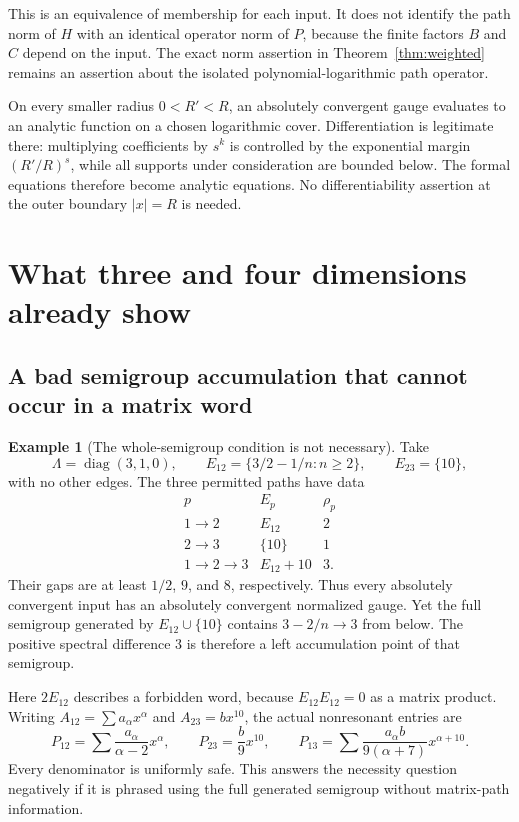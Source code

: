 \documentclass[11pt,a4paper]{article}
\numberwithin{equation}{section}
\theoremstyle{definition}
\newtheorem{example}[theorem]{Example}
\theoremstyle{remark}
\newcommand{\diag}{\operatorname{diag}}
\begin{document}
This is an equivalence of membership for each input. It does not identify
the path norm of $H$ with an identical operator norm of $P$, because the
finite factors $B$ and $C$ depend on the input. The exact norm assertion in
Theorem~\ref{thm:weighted} remains an assertion about the isolated
polynomial-logarithmic path operator.

On every smaller radius $0<R'<R$, an absolutely convergent gauge evaluates
to an analytic function on a chosen logarithmic cover. Differentiation is
legitimate there: multiplying coefficients by $s^k$ is controlled by the
exponential margin $(R'/R)^s$, while all supports under consideration are
bounded below. The formal equations therefore become analytic equations.
No differentiability assertion at the outer boundary $|x|=R$ is needed.

\section{What three and four dimensions already show}
\label{sec:examples}

\subsection{A bad semigroup accumulation that cannot occur in a matrix word}
\begin{example}[The whole-semigroup condition is not necessary]
\label{ex:harmless}
Take
\[
 \Lambda=\diag(3,1,0),\qquad
 E_{12}=\{3/2-1/n:n\geq2\},\qquad E_{23}=\{10\},
\]
with no other edges. The three permitted paths have data
\[
 \begin{array}{c|c|c}
 p&E_p&\rho_p\\ \hline
 1\to2&E_{12}&2\\
 2\to3&\{10\}&1\\
 1\to2\to3&E_{12}+10&3.
 \end{array}
\]
Their gaps are at least $1/2$, $9$, and $8$, respectively. Thus every
absolutely convergent input has an absolutely convergent normalized gauge.
Yet the full semigroup generated by $E_{12}\cup\{10\}$ contains
$3-2/n\to3$ from below. The positive spectral difference $3$ is therefore
a left accumulation point of that semigroup.
\end{example}

Here $2E_{12}$ describes a forbidden word, because $E_{12}E_{12}=0$ as a
matrix product. Writing $A_{12}=\sum a_\alpha x^\alpha$ and
$A_{23}=b x^{10}$, the actual nonresonant entries are
\[
 P_{12}=\sum\frac{a_\alpha}{\alpha-2}x^\alpha,\qquad
 P_{23}=\frac b9x^{10},\qquad
 P_{13}=\sum\frac{a_\alpha b}{9(\alpha+7)}x^{\alpha+10}.
\]
Every denominator is uniformly safe. This answers the necessity question
negatively if it is phrased using the full generated semigroup without
matrix-path information.
\end{document}
